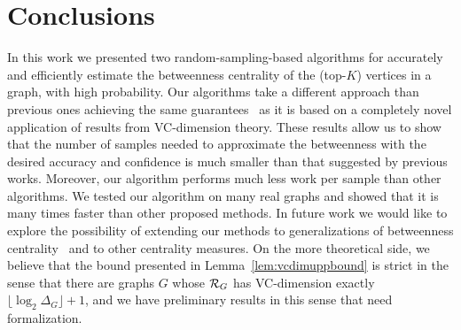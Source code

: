 \section{Conclusions}\label{sec:concl}
In this work we presented two random-sampling-based algorithms for accurately and
efficiently estimate the betweenness centrality of the (top-$K$) vertices in a
graph, with high probability.
Our algorithms take a different approach than previous ones achieving the same
guarantees~\citep{BrandesP07,GeisbergerSS08,JacobKLPT05} as it is based on a
completely novel application of results from VC-dimension theory. These results
allow us to show that the number of samples needed to approximate the
betweenness with the desired accuracy and confidence is much smaller than that
suggested by previous works. Moreover, our algorithm performs much less work
per sample than other algorithms. We tested our algorithm on many real graphs
and showed that it is many times faster than other proposed methods. In future
work we would like to explore the possibility of extending our methods to
generalizations of betweenness centrality~\citep{DolevEP10} and to other centrality
measures. On the more theoretical side, we believe that the bound presented in
Lemma~\ref{lem:vcdimuppbound} is strict in the sense that there are graphs $G$
whose $\mathcal{R}_G$ has VC-dimension exactly $\lfloor\log_2\Delta_G\rfloor+1$, and
we have preliminary results in this sense that need formalization. 

